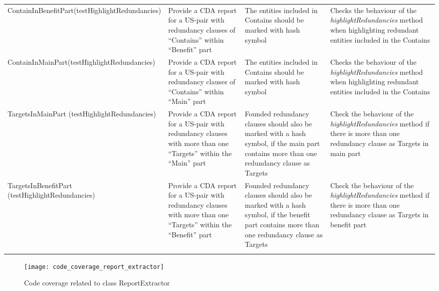 \begin{tabularx}{\textwidth}{X  X  X  X}
			ContainInBenefitPart\newline(testHighlightRedundancies)&Provide a CDA report for a US-pair with redundancy clauses of \enquote{Contains} within \enquote{Benefit} part&The entities included in Contains should be marked with hash symbol&Checks the behaviour of the \textit{highlightRedundancies} method when highlighting redundant entities included in the Contains\\
			
			ContainInMainPart\newline(testHighlightRedundancies)&Provide a CDA report for a US-pair with redundancy clauses of \enquote{Contains} within \enquote{Main} part&The entities included in Contains should be marked with hash symbol&Checks the behaviour of the \textit{highlightRedundancies} method when highlighting redundant entities included in the Contains\\
			
			TargetsInMainPart \newline(testHighlightRedundancies)&Provide a CDA report for a US-pair with redundancy clauses with more than one \enquote{Targets} within the \enquote{Main} part&Founded redundancy clauses should also be marked with a hash symbol, if the main part contains more than one redundancy clause as Targets&Check the behaviour of the \textit{highlightRedundancies} method if there is more than one redundancy clause as Targets in main part\\
			
			TargetsInBenefitPart \newline(testHighlightRedundancies)&Provide a CDA report for a US-pair with redundancy clauses with more than one \enquote{Targets} within the \enquote{Benefit} part&Founded redundancy clauses should also be marked with a hash symbol, if the benefit part contains more than one redundancy clause as Targets&Check the behaviour of the \textit{highlightRedundancies} method if there is more than one redundancy clause as Targets in benefit part\\
			
			
			\hline
				\caption{Test cases for ReportExtractor  class}\label{tb:test_cases_report_extractor}
		\end{tabularx}		
		\endgroup

\begin{figure}[h]
	\centering
	\texttt{[image: code\_coverage\_report\_extractor]}
	\caption{Code coverage related to class ReportExtractor}\label{fig:code_coverage_report_extractor}
\end{figure} 

